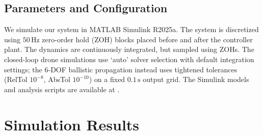 \documentclass[conf]{new-aiaa}
\begin{document}
\subsection{Parameters and Configuration}
We simulate our system in MATLAB Simulink R2025a. The system is discretized using $50\,\text{Hz}$ zero-order hold (ZOH) blocks placed before and after the controller plant. The dynamics are continuously integrated, but sampled using ZOHs. The closed-loop drone simulations use `auto’ solver selection with default integration settings; the 6-DOF ballistic propagation instead uses tightened tolerances (RelTol $10^{-8}$, AbsTol $10^{-10}$) on a fixed $0.1\,\text{s}$ output grid. The Simulink models and analysis scripts are available at \cite{refs:github}.

\section{Simulation Results}
\end{document}
